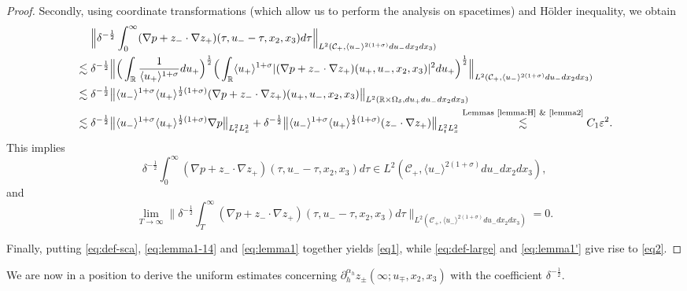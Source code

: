 \documentclass[10pt,reqno]{amsart}
\numberwithin{equation}{section}
\begin{document}
\begin{proof}
Secondly, using coordinate transformations (which allow us to perform the analysis on spacetimes) and H\"older inequality, we obtain
\begin{align*}
	&\ \ \ \ \Big\|\delta^{-\frac{1}{2}}\int_0^{\infty}  (\nabla p+z_{-}\cdot\nabla z_{+}) 
	(\tau,u_--\tau,x_2,x_3)d\tau\Big\|_{L^2(\mathcal{C}_+,\langle u_-\rangle^{2(1+\sigma)}du_-dx_2dx_3)}\\
	&
	\lesssim\delta^{-\frac{1}{2}}\Big\|\Big(\int_{\mathbb{R}}\frac{1}{\langle u_+\rangle^{1+\sigma}}du_+\Big)^{\frac{1}{2}}\Big(\int_{\mathbb{R}}\langle u_+\rangle^{1+\sigma} |(\nabla p+z_{-}\cdot\nabla z_{+}) 
	(u_+,u_-,x_2,x_3)|^2du_+\Big)^{\frac{1}{2}}\Big\|_{L^2(\mathcal{C}_+,\langle u_-\rangle^{2(1+\sigma)}du_-dx_2dx_3)}\\
	&\lesssim\delta^{-\frac{1}{2}}\big\|\langle u_-\rangle^{1+\sigma}\langle u_+\rangle^{\frac{1}{2}(1+\sigma)} (\nabla p+z_{-}\cdot\nabla z_{+}) 
	(u_+,u_-,x_2,x_3)\big\|_{L^2(\mathbb{R}\times\Omega_\delta,du_+du_-dx_2dx_3)}\\
	&\lesssim\delta^{-\frac{1}{2}}\big\|\langle u_-\rangle^{1+\sigma}\langle u_+\rangle^{\frac{1}{2}(1+\sigma)} \nabla p\big\|_{L^2_tL^2_x}+\delta^{-\frac{1}{2}}\big\|\langle u_-\rangle^{1+\sigma}\langle u_+\rangle^{\frac{1}{2}(1+\sigma)}(z_-\cdot \nabla z_+)\big\|_{L^2_tL^2_x}
	\stackrel{\text{Lemmas \ref{lemma:H} \& \ref{lemma2}}}{\lesssim}C_1\varepsilon^2.
\end{align*}	
This implies 
\begin{equation}\label{eq:lemma1}
	\delta^{-\frac{1}{2}}\int_0^{\infty} (\nabla p+z_{-}\cdot\nabla z_{+}) 
	(\tau,u_--\tau,x_2,x_3)d\tau\in L^2(\mathcal{C}_+,\langle u_-\rangle^{2(1+\sigma)}du_-dx_2dx_3),
\end{equation}
and
\begin{equation}\label{eq:lemma1'}
\lim_{T\to \infty}\Big\|\delta^{-\frac{1}{2}}\int_T^{\infty}  (\nabla p+z_{-}\cdot\nabla z_{+}) 
(\tau,u_--\tau,x_2,x_3)d\tau\Big\|_{L^2(\mathcal{C}_+,\langle u_-\rangle^{2(1+\sigma)}du_-dx_2dx_3)}=0.
\end{equation}

Finally, putting \eqref{eq:def-sca}, \eqref{eq:lemma1-14} and \eqref{eq:lemma1} together yields \eqref{eq1}, while \eqref{eq:def-large} and \eqref{eq:lemma1'} give rise to  \eqref{eq2}.
\end{proof}

 
 

We are now in a position to derive the uniform estimates concerning $\partial_h^{\alpha_h}z_\pm(\infty;u_\mp,x_2,x_3)$ with the coefficient $\delta^{-\frac{1}{2}}$.
 
\end{document}
